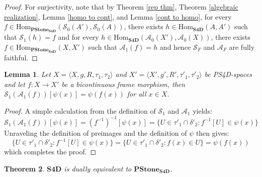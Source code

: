 \documentclass{amsart}
\theoremstyle{plain}
\newtheorem{theorem}{Theorem}[section]
\newtheorem{lemma}[theorem]{Lemma}
\newcommand{\Hom}{\ensuremath{\mathrm{Hom}}}
\theoremstyle{definition}
\begin{document}
\begin{proof}
For surjectivity, note that by Theorem \ref{rep thm}, Theorem \ref{algebraic realization}, Lemma \ref{homo to cont}, and Lemma \ref{cont to homo}, for every $f \in \Hom_{\mathbf{PStone_{S4D}}}(\mathcal{S}_0(A'), \mathcal{S}_0(A))$, there exists $h\in\Hom_{\mathbf{S4D}}(A,A')$ such that $\mathcal{S}_1(h)=f$ and  for every $h \in \Hom_{\mathbf{S4D}}(\mathcal{A}_0(X'), \mathcal{A}_0(X))$, there exists $f\in\Hom_{\mathbf{PStone_{S4D}}}(X,X')$ such that $\mathcal{A}_1(f)=h$ and hence $\mathcal{S}_F$ and $\mathcal{A}_F$ are fully faithful.
\end{proof}




\begin{lemma}
    Let $X = \langle X, g, R, \tau_1, \tau_2 \rangle$ and $X' = \langle X', g', R', \tau'_1, \tau'_2 \rangle$ be PS4D-spaces and let $f\colon X\to X'$ be a bicontinuous frame morphism, then $\mathcal{S}_1(\mathcal{A}_1(f))[\psi(x)]=\psi(f(x))$ for all $x\in X$. 
\end{lemma}
    \begin{proof}
    A simple calculation from the definition of $\mathcal{S}_1$ and $\mathcal{A}_1$ yields: 
    \[\mathcal{S}_1(\mathcal{A}_1(f))[\psi(x)]=(f^{-1})^{-1}[\psi(x)]=\{U\in\tau'_1\cap\delta'_2:f^{-1}[U]\in\psi(x)\}\] Unraveling the definition of preimages and the definition of $\psi$ then gives: 
    \[\{U\in\tau'_1\cap\delta'_2:f^{-1}[U]\in\psi(x)\}=\{U\in\tau'_1\cap\delta'_2:f(x)\in U\}=\psi(f(x))\] which completes the proof. 
\end{proof}

\begin{theorem}\label{main theorem}
    $\mathbf{S4D}$ is dually equivalent to $\mathbf{PStone_{S4D}}$. 
\end{theorem}
\end{document}
